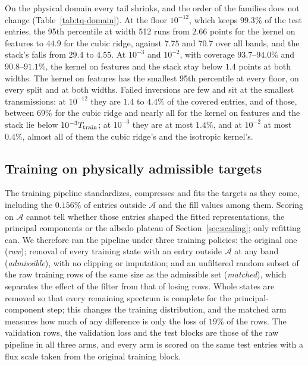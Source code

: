 \begin{table}[t]
\centering
\resizebox{\textwidth}{!}{}
\caption{The main pipeline on the physical domain: the raw arm, mean $\pm$ sample standard deviation
over ten splits. Radiance is the mean relative error in percent, and the all-band column is
the unrestricted inverse of Table~\ref{tab:tails}. At each floor $\tau_0$, the failed column is the
percentage of covered entries at which the inversion fails, and $p_{95}$ is the 95th percentile of the
absolute reflectance error over the successful inversions, in percentage points.}
\label{tab:tq-domain}
\end{table}

On the physical domain every tail shrinks, and the order of the families does not change (Table~\ref{tab:tq-domain}). At the floor $10^{-12}$, which keeps $99.3\%$ of the test entries, the 95th percentile at width 512 runs from $2.66$ points for the kernel on features to $44.9$ for the cubic ridge, against $7.75$ and $70.7$ over all bands, and the stack's falls from $29.4$ to $4.55$. At $10^{-3}$ and $10^{-2}$, with coverage $93.7$--$94.0\%$ and $90.8$--$91.1\%$, the kernel on features and the stack stay below $1.4$ points at both widths. The kernel on features has the smallest 95th percentile at every floor, on every split and at both widths. Failed inversions are few and sit at the smallest transmissions: at $10^{-12}$ they are $1.4$ to $4.4\%$ of the covered entries, and of those, between $69\%$ for the cubic ridge and nearly all for the kernel on features and the stack lie below $10^{-3}T_{\rm train}$; at $10^{-3}$ they are at most $1.4\%$, and at $10^{-2}$ at most $0.4\%$, almost all of them the cubic ridge's and the isotropic kernel's.

\subsection{Training on physically admissible targets}\label{sec:tq-policy}
The training pipeline standardizes, compresses and fits the targets as they come, including the
$0.156\%$ of entries outside $\mathcal A$ and the fill values among them. Scoring on $\mathcal A$
cannot tell whether those entries shaped the fitted representations, the principal components or
the albedo plateau of Section~\ref{sec:scaling}; only refitting can. We therefore ran the pipeline
under three training policies: the original one (\emph{raw}); removal of every training state with
an entry outside $\mathcal A$ at any band (\emph{admissible}), with no clipping or imputation; and
an unfiltered random subset of the raw training rows of the same size as the admissible set
(\emph{matched}), which separates the effect of the filter from that of losing rows. Whole states
are removed so that every remaining spectrum is complete for the principal-component step; this
changes the training distribution, and the matched arm measures how much of any difference is
only the loss of $19\%$ of the rows. The validation rows, the validation loss and the test blocks
are those of the raw pipeline in all three arms, and every arm is scored on the same test entries
with a flux scale taken from the original training block.

